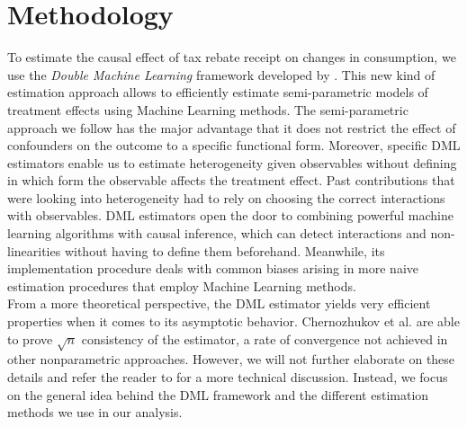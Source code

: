 \section{Methodology} \label{sec:methodology}
To estimate the causal effect of tax rebate receipt on changes in consumption, we use the \textit{Double Machine Learning} framework developed by \cite{DML2017}. This new kind of estimation approach allows to efficiently estimate semi-parametric models of treatment effects using Machine Learning methods. The semi-parametric approach we follow has the major advantage that it does not restrict the effect of confounders on the outcome to a specific functional form. Moreover, specific DML estimators enable us to estimate heterogeneity given observables without defining in which form the observable affects the treatment effect. Past contributions that were looking into heterogeneity had to rely on choosing the correct interactions with observables. DML estimators open the door to combining powerful machine learning algorithms with causal inference, which can detect interactions and non-linearities without having to define them beforehand. Meanwhile, its implementation procedure deals with common biases arising in more naive estimation procedures that employ Machine Learning methods. \\
From a more theoretical perspective, the DML estimator yields very efficient properties when it comes to its asymptotic behavior. Chernozhukov et al. are able to prove $\sqrt{n}$ consistency of the estimator, a rate of convergence not achieved in other nonparametric approaches. However, we will not further elaborate on these details and refer the reader to \cite{DML2017} for a more technical discussion. Instead, we focus on the general idea behind the DML framework and the different estimation methods we use in our analysis.

